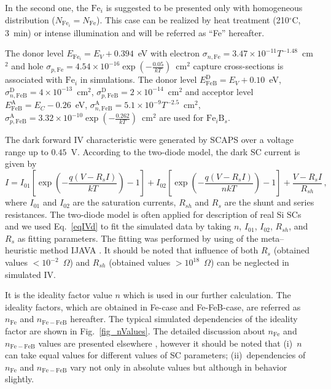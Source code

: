 \documentclass[num-refs]{wiley-article} %
\begin{document}
In the second one, the $\mathrm{Fe}_i$ is suggested to be presented only with homogeneous distribution ($N_{\mathrm{Fe}_i}=N_{\mathrm{Fe}}$).
This case can be realized by heat treatment (210$^\circ$C, 3~min) \cite{FeB_Zong} or intense illumination \cite{FeBLight2} and will be referred as ``Fe'' hereafter.

The donor level $E_{\mathrm{Fe}_i} = E_V+0.394$~eV
with electron $\sigma_{n,{\mathrm{Fe}}}=3.47\times10^{-11}T^{-1.48}$~cm$^2$ and
hole $\sigma_{p,{\mathrm{Fe}}}=4.54\times10^{-16}\exp\left(-\frac{0.05}{kT}\right)$~cm$^2$ capture cross-sections \cite{MurphyJAP2011,ROUGIEUX2018}
is associated with $\mathrm{Fe}_i$ in simulations.
The donor level $E_{\mathrm{FeB}}^\mathrm{D}= E_V+0.10$~eV,
$\sigma_{n,{\mathrm{FeB}}}^\mathrm{D}=4\times10^{-13}$~cm$^2$,
$\sigma_{p,{\mathrm{FeB}}}^\mathrm{D}=2\times10^{-14}$~cm$^2$
and acceptor level $E_{\mathrm{FeB}}^\mathrm{A}= E_C-0.26$~eV,
$\sigma_{n,{\mathrm{FeB}}}^\mathrm{A}=5.1\times10^{-9}T^{-2.5}$~cm$^2$,
$\sigma_{p,{\mathrm{FeB}}}^\mathrm{A}=3.32\times10^{-10}\exp\left(-\frac{0.262}{kT}\right)$~cm$^2$
\cite{Istratov1999,MurphyJAP2011,ROUGIEUX2018}
are used for $\mathrm{Fe}_i\mathrm{B}_s$.

The dark forward IV characteristic were generated by SCAPS over a voltage range up to $0.45$~V.
According to the two-diode model, the dark SC current is given by \citep{Breitenstein2013}
\begin{equation}
\label{eqIVd}
    I=I_{01}\left[\exp\left(-\frac{q(V-R_sI)}{kT}\right)-1\right]
      + I_{02}\left[\exp\left(-\frac{q(V-R_sI)}{nkT}\right)-1\right]
      +\frac{V-R_sI}{R_{sh}}\,,
\end{equation}
where
$I_{01}$ and $I_{02}$ are the saturation currents,
$R_{sh}$ and $R_s$ are the shunt and series resistances.
The two-diode model is often applied for description of real Si SCs
and we used Eq.~\ref{eqIVd} to fit the simulated data by taking $n$, $I_{01}$, $I_{02}$,
$R_{sh}$, and $R_s$ as fitting parameters.
The fitting was performed by using of the meta--heuristic method IJAVA \cite{IJAVA}.
It should be noted that influence of both $R_s$ (obtained values $<10^{-2}$~$\Omega$) and $R_{sh}$
(obtained values $>10^{18}$~$\Omega$) can be neglected in simulated IV.

It is the ideality factor value $n$ which is used in our further calculation.
The ideality factors, which are obtained in  Fe-case and Fe-FeB-case,
are referred as  $n_\mathrm{Fe}$ and $n_\mathrm{Fe-FeB}$ hereafter.
The typical simulated dependencies of  the ideality factor are shown in Fig.~\ref{fig_nValues}.
The detailed discussion about $n_\mathrm{Fe}$ and $n_\mathrm{Fe-FeB}$  values are presented elsewhere \cite{OlikhJPS},
however it should be noted that
(i)~$n$ can take equal values for different  values of SC parameters;
(ii)~dependencies of $n_\mathrm{Fe}$ and $n_\mathrm{Fe-FeB}$ vary not only in absolute values but although in behavior slightly.
\end{document}
